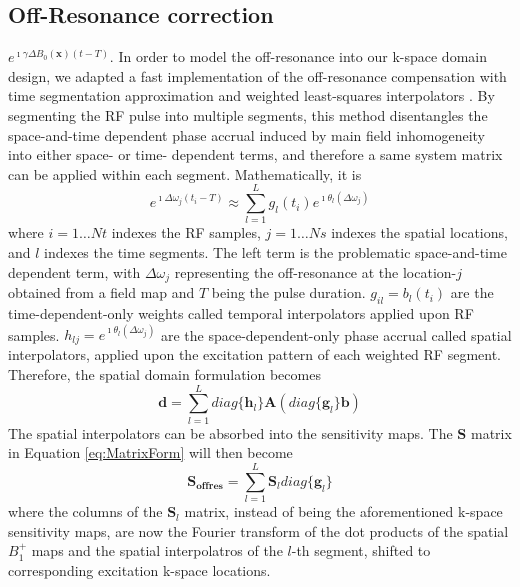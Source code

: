 \subsection*{ Off-Resonance correction}
$e^{\imath \gamma \Delta B_0(\mathbf{x})(t-T)}$. 
In order to model the off-resonance into our k-space domain design, we adapted a fast implementation of the off-resonance compensation with time segmentation approximation and weighted least-squares interpolators \cite{fessler2005toeplitz}. 
By segmenting the RF pulse into multiple segments, this method disentangles the space-and-time dependent phase accrual induced by main field inhomogeneity into either space- or time- dependent terms, and therefore a same system matrix can be applied within each segment. Mathematically, it is
\begin{equation*}
e^{\imath \Delta\omega_j (t_i-T) }\approx\sum_{l=1}^{L} g_{l}(t_i) e^{\imath \theta_{l}(\Delta\omega_j)}
\end{equation*}
where $i=1\dots Nt$ indexes the RF samples, $j=1\dots Ns$ indexes the spatial locations, and $l$ indexes the time segments. The left term is the problematic space-and-time dependent term, with $\Delta\omega_j$ representing the off-resonance at the location-$j$ obtained from a field map and $T$ being the pulse duration. $g_{il}=b_{l}(t_i)$ are the time-dependent-only weights called temporal interpolators applied upon RF samples. $h_{lj}=e^{\imath \theta_{l}(\Delta\omega_j)}$ are the space-dependent-only phase accrual called spatial interpolators, applied upon the excitation pattern of each weighted RF segment. Therefore, the spatial domain formulation becomes
\begin{equation*}
\mathbf{d}=\sum_{l=1}^{L}diag\{\mathbf{h}_l\}\mathbf{A}(diag\{\mathbf{g}_l\}\mathbf{b})
\end{equation*}
The spatial interpolators can be absorbed into the sensitivity maps. The $\mathbf{S}$ matrix in Equation \ref{eq:MatrixForm} will then become 
\begin{equation*}
\mathbf{S_{offres}}=\sum_{l=1}^{L}\mathbf{S}_l diag\{\mathbf{g}_l\}
\end{equation*}
where the columns of the $\mathbf{S}_l$ matrix, instead of being the aforementioned k-space sensitivity maps, are now the Fourier transform of the dot products of the spatial $B_1^+$ maps and the spatial interpolatros of the $l$-th segment, shifted to corresponding excitation k-space locations. 
